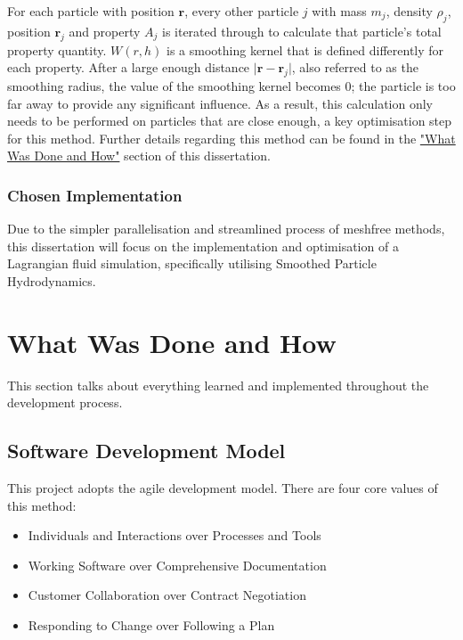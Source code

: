 \documentclass[12pt]{article}
\begin{document}
    For each particle with position $\textbf{r}$, every other particle $j$ with mass $m_j$, density $\rho_j$, position $\textbf{r}_j$ and property $A_j$ is iterated through to calculate that particle's total property quantity. $W(r, h)$ is a smoothing kernel that is defined differently for each property. After a large enough distance $\lvert\textbf{r} - \textbf{r}_j\rvert$, also referred to as the smoothing radius, the value of the smoothing kernel becomes 0; the particle is too far away to provide any significant influence. As a result, this calculation only needs to be performed on particles that are close enough, a key optimisation step for this method. Further details regarding this method can be found in the \hyperref[sec:whatwasdoneandhow]{"What Was Done and How"} section of this dissertation.

    \subsubsection{Chosen Implementation}

    Due to the simpler parallelisation and streamlined process of meshfree methods, this dissertation will focus on the implementation and optimisation of a Lagrangian fluid simulation, specifically utilising Smoothed Particle Hydrodynamics.

    \section{What Was Done and How}
    \label{sec:whatwasdoneandhow}

    This section talks about everything learned and implemented throughout the development process.

    \subsection{Software Development Model}

    This project adopts the agile development model. There are four core values of this method\cite{geekagile}:
    
    \begin{itemize}
        \item Individuals and Interactions over Processes and Tools
        \item Working Software over Comprehensive Documentation
        \item Customer Collaboration over Contract Negotiation
        \item Responding to Change over Following a Plan
    \end{itemize}
\end{document}
